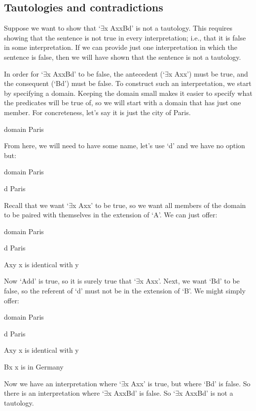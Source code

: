 \subsection{Tautologies and contradictions}

Suppose we want to show that ‘$\exists$x Axx\eif Bd’ is not a tautology. This requires showing that the sentence is not true in every interpretation; i.e., that it is false in some interpretation. If we can provide just one interpretation in which the sentence is false, then we will have shown that the sentence is not a tautology.

In order for ‘$\exists$x Axx\eif Bd’ to be false, the antecedent (‘$\exists$x Axx’) must be true, and the consequent (‘Bd’) must be false. To construct such an interpretation, we start by specifying a domain. Keeping the domain small makes it easier to specify what the predicates will be true of, so we will start with a domain that has just one member. For concreteness, let’s say it is just the city of Paris.

\begin{ekey}\item[domain]  Paris
\end{ekey}
From here, we will need to have some name, let's use ‘d’ and we have no option but:

\begin{ekey}\item[domain]  Paris
\item[d] Paris
\end{ekey}
Recall that we want ‘$\exists$x Axx’ to be true, so we want all members of the domain to be paired with themselves in the extension of ‘A’. We can just offer:

\begin{ekey}\item[domain]  Paris
\item[d] Paris
\item[Axy] x is identical with y
\end{ekey}
Now ‘Add’ is true, so it is surely true that ‘$\exists$x Axx’. Next, we want ‘Bd’ to be false, so the referent of ‘d’ must not be in the extension of ‘B’. We might simply offer:

\begin{ekey}\item[domain]  Paris
\item[d] Paris
\item[Axy] x is identical with y
\item[Bx] x is in Germany
\end{ekey}
Now we have an interpretation where ‘$\exists$x Axx’ is true, but where ‘Bd’ is false. So there is an interpretation where ‘$\exists$x Axx\eif Bd’ is false. So ‘$\exists$x Axx\eif Bd’ is not a tautology.

